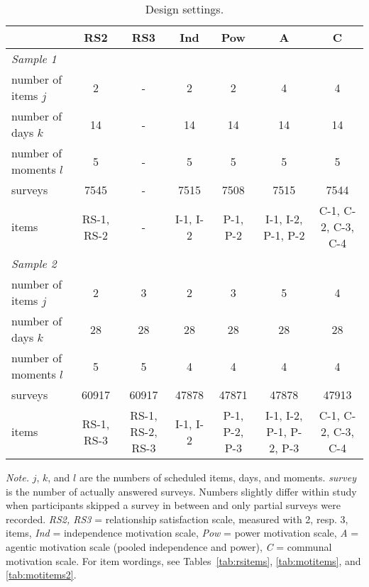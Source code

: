 \documentclass[jou,a4paper,draftfirst]{apa6}\usepackage[]{graphicx}\usepackage[]{color}
\begin{document}
\begin{sidewaystable}
  \begin{threeparttable}
    \caption{Design settings.}
    \label{tab:itemStats}
		\footnotesize
    \begin{tabular}{lcccccc}
      \toprule      
      
      
       & RS2 & RS3 & Ind & Pow & A & C \\ 
      
      \midrule

      \emph{Sample 1} \\
      number of items $j$ & 2 & - & 2 & 2 & 4 & 4\\
      number of days $k$ & 14 & - & 14 & 14 & 14 & 14\\
      number of moments $l$ & 5 & - & 5 & 5 & 5 & 5\\
      surveys & 7545 & - & 7515 & 7508 & 7515 & 7544\\
      \vspace{1em}items & RS-1, RS-2 & - & I-1, I-2 & P-1, P-2 & I-1, I-2, P-1, P-2 & C-1, C-2, C-3, C-4\\
      

     \emph{Sample 2} \\
      number of items $j$ & 2 & 3 & 2 & 3 & 5 & 4\\
      number of days $k$ & 28 & 28 & 28 & 28 & 28 & 28\\
      number of moments $l$ & 5 & 5 & 4 & 4 & 4 & 4\\
      surveys & 60917 & 60917 & 47878 & 47871 & 47878 & 47913\\
      \vspace{1em}items & RS-1, RS-3 & RS-1, RS-2, RS-3 & I-1, I-2 & P-1, P-2, P-3 & I-1, I-2, P-1, P-2, P-3 & C-1, C-2, C-3, C-4\\   
    \midrule
    \end{tabular}
    
    \begin{tablenotes}
      {\small
      \textit{Note.} $j$, $k$, and $l$ are the numbers of scheduled items, days, and moments. \emph{survey} is the number of actually answered surveys. Numbers slightly differ within study when participants skipped a survey in between and only partial surveys were recorded. \emph{RS2, RS3} = relationship satisfaction scale, measured with 2, resp. 3, items, \emph{Ind} = independence motivation scale, \emph{Pow} = power motivation scale, \emph{A} = agentic motivation scale (pooled independence and power), \emph{C} = communal motivation scale. For item wordings, see Tables~\ref{tab:rsitems}, \ref{tab:motitems}, and \ref{tab:motitems2}.}
        \end{tablenotes}
    \end{threeparttable}
\end{sidewaystable}
\end{document}
